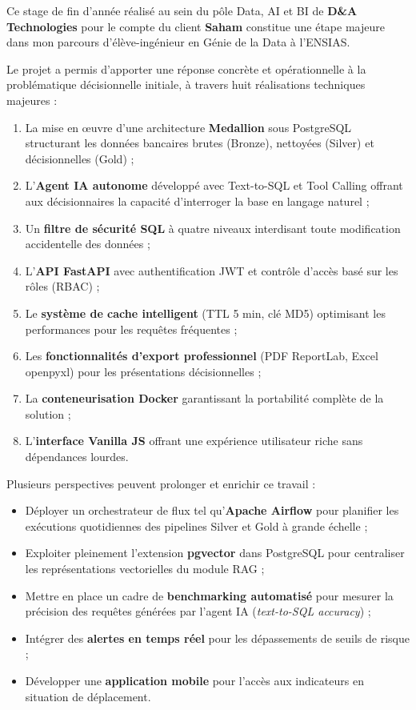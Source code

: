\documentclass[a4paper,12pt]{report}
\begin{document}
\begin{doublespace}
\noindent Ce stage de fin d'année réalisé au sein du pôle Data, AI et BI de \textbf{D\&A Technologies} pour le compte du client \textbf{Saham} constitue une étape majeure dans mon parcours d'élève-ingénieur en Génie de la Data à l'ENSIAS.

\noindent Le projet a permis d'apporter une réponse concrète et opérationnelle à la problématique décisionnelle initiale, à travers huit réalisations techniques majeures :
\begin{enumerate}
    \item La mise en œuvre d'une architecture \textbf{Medallion} sous PostgreSQL structurant les données bancaires brutes (Bronze), nettoyées (Silver) et décisionnelles (Gold) ;
    \item L'\textbf{Agent IA autonome} développé avec Text-to-SQL et Tool Calling offrant aux décisionnaires la capacité d'interroger la base en langage naturel ;
    \item Un \textbf{filtre de sécurité SQL} à quatre niveaux interdisant toute modification accidentelle des données ;
    \item L'\textbf{API FastAPI} avec authentification JWT et contrôle d'accès basé sur les rôles (RBAC) ;
    \item Le \textbf{système de cache intelligent} (TTL 5 min, clé MD5) optimisant les performances pour les requêtes fréquentes ;
    \item Les \textbf{fonctionnalités d'export professionnel} (PDF ReportLab, Excel openpyxl) pour les présentations décisionnelles ;
    \item La \textbf{conteneurisation Docker} garantissant la portabilité complète de la solution ;
    \item L'\textbf{interface Vanilla JS} offrant une expérience utilisateur riche sans dépendances lourdes.
\end{enumerate}

\noindent Plusieurs perspectives peuvent prolonger et enrichir ce travail :
\begin{itemize}
    \item Déployer un orchestrateur de flux tel qu'\textbf{Apache Airflow} pour planifier les exécutions quotidiennes des pipelines Silver et Gold à grande échelle ;
    \item Exploiter pleinement l'extension \textbf{pgvector} dans PostgreSQL pour centraliser les représentations vectorielles du module RAG ;
    \item Mettre en place un cadre de \textbf{benchmarking automatisé} pour mesurer la précision des requêtes générées par l'agent IA (\textit{text-to-SQL accuracy}) ;
    \item Intégrer des \textbf{alertes en temps réel} pour les dépassements de seuils de risque ;
    \item Développer une \textbf{application mobile} pour l'accès aux indicateurs en situation de déplacement.
\end{itemize}
\end{doublespace}
\end{document}
